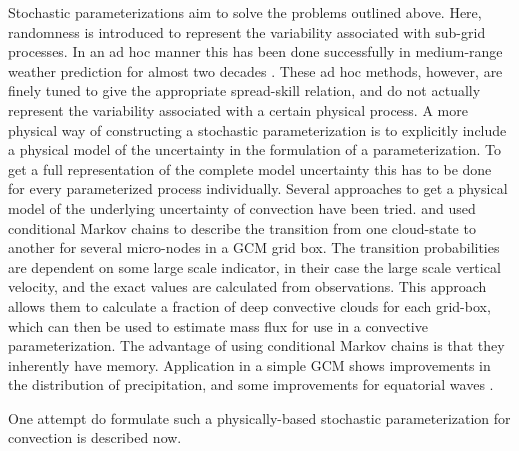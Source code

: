 \documentclass[a4paper, 12pt]{article}
\begin{document}
Stochastic parameterizations aim to solve the problems outlined above. Here, randomness is introduced to represent the variability associated with sub-grid processes. In an ad hoc manner this has been done successfully in medium-range weather prediction for almost two decades \citep{Buizza1999, Berner2009a}. These ad hoc methods, however, are finely tuned to give the appropriate spread-skill relation, and do not actually represent the variability associated with a certain physical process. A more physical way of constructing a stochastic parameterization is to explicitly include a physical model of the uncertainty in the formulation of a parameterization. To get a full representation of the complete model uncertainty this has to be done for every parameterized process individually. 
Several approaches to get a physical model of the underlying uncertainty of convection have been tried. \cite{Dorrestijn2015} and \cite{Gottwald2016} used conditional Markov chains to describe the transition from one cloud-state to another for several micro-nodes in a GCM grid box. The transition probabilities are dependent on some large scale indicator, in their case the large scale vertical velocity, and the exact values are calculated from observations. This approach allows them to calculate a fraction of deep convective clouds for each grid-box, which can then be used to estimate mass flux for use in a convective parameterization. The advantage of using conditional Markov chains is that they inherently have memory. Application in a simple GCM shows improvements in the distribution of precipitation, and some improvements for equatorial waves \citep{Dorrestijn2016}. 

One attempt do formulate such a physically-based stochastic parameterization for convection is described now. 
\end{document}

